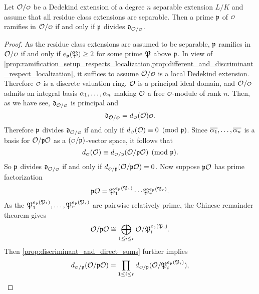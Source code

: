     \begin{theorem}\label{thm:ramifies_if_and_only_if_divides_the_discriminant}
      Let $\mc{O}/\smc{O}$ be a Dedekind extension of a degree $n$ separable extension $L/K$ and assume that all residue class extensions are separable. Then a prime $\mathfrak{p}$ of $\smc{O}$ ramifies in $\mc{O}/\smc{O}$ if and only if $\mathfrak{p}$ divides $\mf{d}_{\mc{O}/\smc{O}}$.
    \end{theorem}
    \begin{proof}
      As the residue class extensions are assumed to be separable, $\mathfrak{p}$ ramifies in $\mc{O}/\smc{O}$ if and only if $e_{\mathfrak{p}}(\mathfrak{P}) \ge 2$ for some prime $\mathfrak{P}$ above $\mathfrak{p}$. In view of \cref{prop:ramification_setup_respects_localization,prop:different_and_discriminant_respect_localization}, it suffices to assume $\mc{O}/\smc{O}$ is a local Dedekind extension. Therefore $\smc{O}$ is a discrete valuation ring, $\mathcal{O}$ is a principal ideal domain, and $\mc{O}/\smc{O}$ admits an integral basis $\alpha_{1},\ldots,\alpha_{n}$ making $\mathcal{O}$ a free $\smc{O}$-module of rank $n$. Then, as we have see, $\mf{d}_{\mc{O}/\smc{O}}$ is principal and
      \[
        \mf{d}_{\mc{O}/\smc{O}} = d_{\smc{O}}(\mc{O})\smc{O}.
      \]
      Therefore $\mathfrak{p}$ divides $\mf{d}_{\mc{O}/\smc{O}}$ if and only if $d_{\smc{O}}(\mc{O}) \equiv 0 \tmod{\mf{p}}$. Since $\overline{\alpha_{1}},\ldots,\overline{\alpha_{n}}$ is a basis for $\mathcal{O}/\mathfrak{p}\mathcal{O}$ as a $(\smc{O}/\mf{p})$-vector space, it follows that
      \[
        d_{\smc{O}}(\mc{O}) \equiv d_{\smc{O}/\mf{p}}(\mc{O}/\mf{p}\mc{O}) \pmod{\mf{p}}.
      \]
      So $\mathfrak{p}$ divides $\mf{d}_{\mc{O}/\smc{O}}$ if and only if $d_{\smc{O}/\mf{p}}(\mc{O}/\mf{p}\mc{O}) = 0$. Now suppose $\mathfrak{p}\mathcal{O}$ has prime factorization
      \[
        \mathfrak{p}\mathcal{O} = \mathfrak{P}_{1}^{e_{\mathfrak{p}}(\mathfrak{P}_{1})} \cdots \mathfrak{P}_{r}^{e_{\mathfrak{p}}(\mathfrak{P}_{r})}.
      \]
      As the $\mathfrak{P}_{1}^{e_{\mathfrak{p}}(\mathfrak{P}_{1})},\ldots,\mathfrak{P}_{r}^{e_{\mathfrak{p}}(\mathfrak{P}_{r})}$ are pairwise relatively prime, the Chinese remainder theorem gives
      \[
        \mathcal{O}/\mathfrak{p}\mathcal{O} \cong \bigoplus_{1 \le i \le r} \mathcal{O}/\mathfrak{P}_{i}^{e_{\mathfrak{p}}(\mathfrak{P}_{i})}.
      \]
      Then \cref{prop:discriminant_and_direct_sums} further implies
      \[
        d_{\smc{O}/\mf{p}}(\mc{O}/\mf{p}\mc{O}) = \prod_{1 \le i \le r}d_{\smc{O}/\mf{p}}(\mc{O}/\mf{P}_{i}^{e_{\mf{p}}(\mf{P}_{i})}),
      \]

\end{proof}
